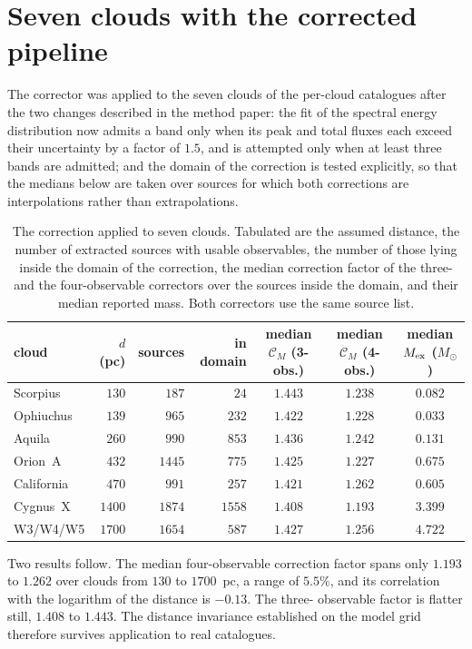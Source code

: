 \documentclass[11pt,a4paper]{article}
\providecommand{\CM}{\mathcal{C}_{M}}
\providecommand{\Mex}{M_{\rm ex}}
\newcommand{\msun}{M_{\odot}}
\begin{document}
\section{Seven clouds with the corrected pipeline}
\label{sec:sevenclouds}

The corrector was applied to the seven clouds of the per-cloud catalogues after
the two changes described in the method paper: the fit of the spectral energy
distribution now admits a band only when its peak and total fluxes each exceed
their uncertainty by a factor of $1.5$, and is attempted only when at least
three bands are admitted; and the domain of the correction is tested
explicitly, so that the medians below are taken over sources for which both
corrections are interpolations rather than extrapolations.

\begin{table}
\caption{The correction applied to seven clouds. Tabulated are the assumed
distance, the number of extracted sources with usable observables, the number
of those lying inside the domain of the correction, the median correction
factor of the three- and the four-observable correctors over the sources
inside the domain, and their median reported mass. Both correctors use the
same source list.}
\label{tab:sevenclouds}
\centering
\begin{tabular}{lrrrccc}
\hline\hline
cloud & $d$ (pc) & sources & in domain & median $\CM$ (3-obs.)
      & median $\CM$ (4-obs.) & median $\Mex$ ($\msun$) \\
\hline
Scorpius   & $130$  & $187$  & $24$   & $1.443$ & $1.238$ & $0.082$ \\
Ophiuchus  & $139$  & $965$  & $232$  & $1.422$ & $1.228$ & $0.033$ \\
Aquila     & $260$  & $990$  & $853$  & $1.436$ & $1.242$ & $0.131$ \\
Orion~A    & $432$  & $1445$ & $775$  & $1.425$ & $1.227$ & $0.675$ \\
California & $470$  & $991$  & $257$  & $1.421$ & $1.262$ & $0.605$ \\
Cygnus~X   & $1400$ & $1874$ & $1558$ & $1.408$ & $1.193$ & $3.399$ \\
W3/W4/W5   & $1700$ & $1654$ & $587$  & $1.427$ & $1.256$ & $4.722$ \\
\hline
\end{tabular}
\end{table}

Two results follow. The median four-observable correction factor spans only
$1.193$ to $1.262$ over clouds from $130$ to $1700$~pc, a range of $5.5\%$, and
its correlation with the logarithm of the distance is $-0.13$. The three-
observable factor is flatter still, $1.408$ to $1.443$. The distance invariance
established on the model grid therefore survives application to real
catalogues.
\end{document}
